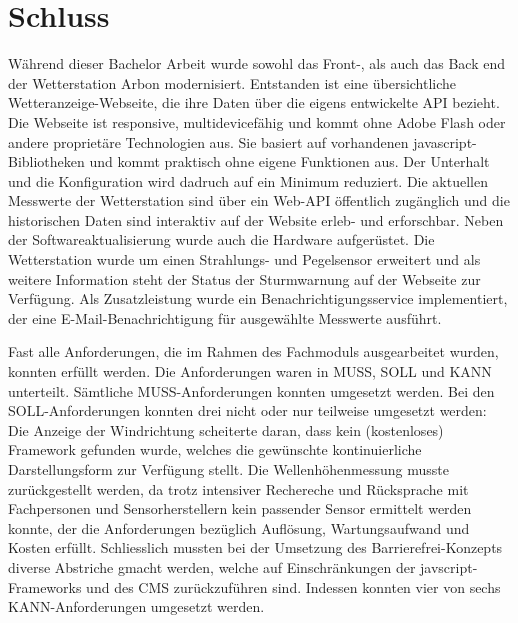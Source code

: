 \section*{Schluss}



Während dieser Bachelor Arbeit wurde sowohl das Front-, als auch das Back end der Wetterstation Arbon modernisiert. Entstanden ist eine übersichtliche Wetteranzeige-Webseite, die ihre Daten über die eigens entwickelte API bezieht. Die Webseite ist responsive, multidevicefähig und kommt ohne Adobe Flash oder andere proprietäre Technologien aus. Sie basiert auf vorhandenen javascript-Bibliotheken und kommt praktisch ohne eigene Funktionen aus. Der Unterhalt und die Konfiguration wird dadruch auf ein Minimum reduziert. Die aktuellen Messwerte der Wetterstation sind über ein Web-API öffentlich zugänglich und die historischen Daten sind interaktiv auf der Website erleb- und erforschbar. Neben der Softwareaktualisierung wurde auch die Hardware aufgerüstet. Die Wetterstation wurde um einen Strahlungs- und Pegelsensor erweitert und als weitere Information steht der Status der Sturmwarnung auf der Webseite zur Verfügung. Als Zusatzleistung wurde ein Benachrichtigungsservice implementiert, der eine E-Mail-Benachrichtigung für ausgewählte Messwerte ausführt.
\newline



Fast alle Anforderungen, die im Rahmen des Fachmoduls ausgearbeitet wurden, konnten erfüllt werden. Die Anforderungen waren in MUSS, SOLL und KANN unterteilt. Sämtliche MUSS-Anforderungen konnten umgesetzt werden. Bei den SOLL-Anforderungen konnten drei nicht oder nur teilweise umgesetzt werden: Die Anzeige der Windrichtung scheiterte daran, dass kein (kostenloses) Framework gefunden wurde, welches die gewünschte kontinuierliche Darstellungsform zur Verfügung stellt. Die Wellenhöhenmessung musste zurückgestellt werden, da trotz intensiver Rechereche und Rücksprache mit Fachpersonen und Sensorherstellern kein passender
Sensor ermittelt werden konnte, der die Anforderungen bezüglich Auflösung, Wartungsaufwand und Kosten erfüllt. Schliesslich mussten bei der Umsetzung des Barrierefrei-Konzepts diverse Abstriche gmacht werden, welche auf Einschränkungen der javscript-Frameworks und des CMS zurückzuführen sind. Indessen konnten vier von sechs KANN-Anforderungen umgesetzt werden.
\newline

